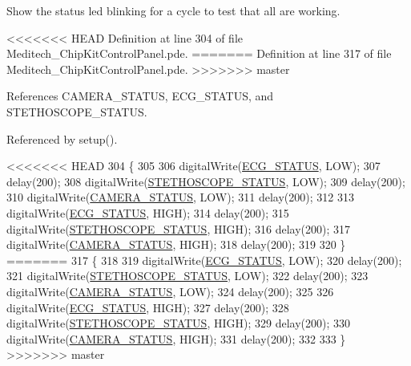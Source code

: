 \begin{DoxyCode}
\begin{DoxyCode}
\begin{DoxyCode}
\begin{DoxyCode}
Show the status led blinking for a cycle to test that all are working. 



<<<<<<< HEAD
Definition at line 304 of file Meditech\-\_\-\-Chip\-Kit\-Control\-Panel.\-pde.
=======
Definition at line 317 of file Meditech\-\_\-\-Chip\-Kit\-Control\-Panel.\-pde.
>>>>>>> master



References C\-A\-M\-E\-R\-A\-\_\-\-S\-T\-A\-T\-U\-S, E\-C\-G\-\_\-\-S\-T\-A\-T\-U\-S, and S\-T\-E\-T\-H\-O\-S\-C\-O\-P\-E\-\_\-\-S\-T\-A\-T\-U\-S.



Referenced by setup().


\begin{DoxyCode}
<<<<<<< HEAD
304                      \{
305 
306   digitalWrite(\hyperlink{_globals_8h_a81c971d1ee27ca31e310c80ef260b390}{ECG\_STATUS}, LOW);
307   delay(200);  
308   digitalWrite(\hyperlink{_globals_8h_a8519a074bf27b6dcc876ce549b2f5ea7}{STETHOSCOPE\_STATUS}, LOW);
309   delay(200);  
310   digitalWrite(\hyperlink{_globals_8h_ad0154ccab9906702a495f07dfedd0136}{CAMERA\_STATUS}, LOW);
311   delay(200);  
312 
313   digitalWrite(\hyperlink{_globals_8h_a81c971d1ee27ca31e310c80ef260b390}{ECG\_STATUS}, HIGH);
314   delay(200);  
315   digitalWrite(\hyperlink{_globals_8h_a8519a074bf27b6dcc876ce549b2f5ea7}{STETHOSCOPE\_STATUS}, HIGH);
316   delay(200);  
317   digitalWrite(\hyperlink{_globals_8h_ad0154ccab9906702a495f07dfedd0136}{CAMERA\_STATUS}, HIGH);
318   delay(200);  
319 
320 \}
=======
317                      \{
318 
319   digitalWrite(\hyperlink{_globals_8h_a81c971d1ee27ca31e310c80ef260b390}{ECG\_STATUS}, LOW);
320   delay(200);  
321   digitalWrite(\hyperlink{_globals_8h_a8519a074bf27b6dcc876ce549b2f5ea7}{STETHOSCOPE\_STATUS}, LOW);
322   delay(200);  
323   digitalWrite(\hyperlink{_globals_8h_ad0154ccab9906702a495f07dfedd0136}{CAMERA\_STATUS}, LOW);
324   delay(200);  
325 
326   digitalWrite(\hyperlink{_globals_8h_a81c971d1ee27ca31e310c80ef260b390}{ECG\_STATUS}, HIGH);
327   delay(200);  
328   digitalWrite(\hyperlink{_globals_8h_a8519a074bf27b6dcc876ce549b2f5ea7}{STETHOSCOPE\_STATUS}, HIGH);
329   delay(200);  
330   digitalWrite(\hyperlink{_globals_8h_ad0154ccab9906702a495f07dfedd0136}{CAMERA\_STATUS}, HIGH);
331   delay(200);  
332 
333 \}
>>>>>>> master
\end{DoxyCode}
\hypertarget{_meditech___chip_kit_control_panel_8pde_a5a7516a22f178c51ec37c6c8167aaf70}{
}
\end{DoxyCode}
\end{DoxyCode}
\end{DoxyCode}
\end{DoxyCode}
